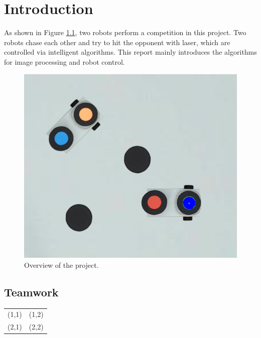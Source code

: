\chapter{Introduction}
\renewcommand{\thepage}{\arabic{page}}
\setcounter{page}{1}

As shown in Figure \ref{intro}, two robots perform a competition in this project. Two robots chase each other and try to hit the opponent with laser, which are controlled via intelligent algorithms. This report mainly introduces the algorithms for image processing and robot control.

\begin{figure}[thb]
    \centering
    \includegraphics[width=1\textwidth]{images/intro.png}
    \caption[Overview of the project]{Overview of the project.}\label{intro}
\end{figure}

\section{Teamwork}

\begin{tabular}{cc}%
(1,1)&(1,2)\\%
(2,1)&(2,2)\\%
\end{tabular}


